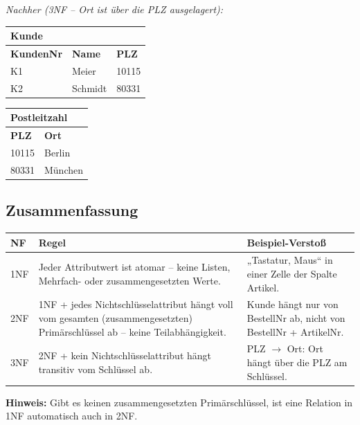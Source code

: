 \textit{Nachher (3NF -- Ort ist über die PLZ ausgelagert):}
\begin{center}
\begin{tabularx}{\textwidth}{l l X}
  \toprule
  \multicolumn{3}{l}{\textbf{Kunde}} \\
  \midrule
  \textbf{KundenNr} & \textbf{Name} & \textbf{PLZ} \\
  \midrule
  K1 & Meier & 10115 \\
  K2 & Schmidt & 80331 \\
  \bottomrule
\end{tabularx}
\end{center}
\begin{center}
\begin{tabularx}{\textwidth}{l X}
  \toprule
  \multicolumn{2}{l}{\textbf{Postleitzahl}} \\
  \midrule
  \textbf{PLZ} & \textbf{Ort} \\
  \midrule
  10115 & Berlin \\
  80331 & München \\
  \bottomrule
\end{tabularx}
\end{center}

\subsection{Zusammenfassung}
\begin{center}
\begin{tabularx}{\textwidth}{l X X}
  \toprule
  \textbf{NF} & \textbf{Regel} & \textbf{Beispiel-Verstoß} \\
  \midrule
  1NF & Jeder Attributwert ist atomar -- keine Listen, Mehrfach- oder zusammengesetzten Werte. & „Tastatur, Maus“ in einer Zelle der Spalte Artikel. \\
  2NF & 1NF + jedes Nichtschlüsselattribut hängt voll vom gesamten (zusammengesetzten) Primärschlüssel ab -- keine Teilabhängigkeit. & Kunde hängt nur von BestellNr ab, nicht von BestellNr + ArtikelNr. \\
  3NF & 2NF + kein Nichtschlüsselattribut hängt transitiv vom Schlüssel ab. & PLZ $\rightarrow$ Ort: Ort hängt über die PLZ am Schlüssel. \\
  \bottomrule
\end{tabularx}
\end{center}
\textbf{Hinweis:} Gibt es keinen zusammengesetzten Primärschlüssel, ist eine Relation in 1NF automatisch auch in 2NF.
\newpage

